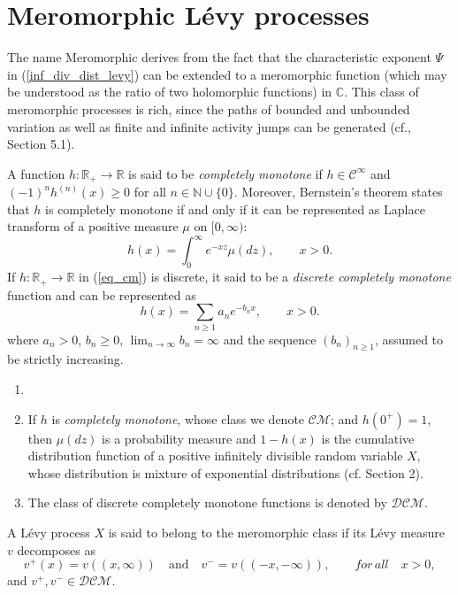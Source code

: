 \section{Meromorphic  L\'evy processes}\label{Sect_Merom}
The name Meromorphic derives from the fact that the characteristic exponent $\Psi$ in (\ref{inf_div_dist_levy}) can be extended to a meromorphic function (which may be understood as the ratio of two holomorphic functions) in $\mathbb{C}$. This class of meromorphic processes is rich, since the paths of bounded and unbounded variation as well as finite and infinite activity jumps can be generated (cf., Section 5.1).
\begin{definition}
A function $h:\mathbb{R}_+ \to \mathbb{R}$ is said to be \emph{completely monotone} if $h \in \mathcal{C}^\infty $ and $(-1)^n h^{(n)}(x) \geq 0$ for all $n \in \mathbb{N} \cup \{0\}$. Moreover, Bernstein's theorem states that $h$ is completely monotone if and only if it can be represented as Laplace transform of a positive measure $\mu$ on $[0, \infty)$:
\begin{equation}\label{eq_cm}
    h(x) = \int_0^\infty e^{-xz} \mu(dz),  \qquad x>0. 
\end{equation}
If $h:\mathbb{R}_+ \to \mathbb{R}$ in (\ref{eq_cm}) is discrete, it said to be a \emph{discrete completely monotone} function and can be represented as  
\begin{equation*}
    h(x) = \sum_{n \geq 1} a_n e^{-b_n x}, \qquad x>0.
\end{equation*}
where $a_n >0$, $b_n \geq 0$, $\lim_{n \to \infty} b_n = \infty$ and the sequence $(b_n)_{n \geq 1}$, assumed to be strictly increasing.
\end{definition}
\begin{remark}
\begin{enumerate}[label=(\roman*)]
    \item[]
    \item If $h$ is \emph{completely monotone}, whose class we denote $\mathcal{C} \mathcal{M}$; and   $h(0^+) = 1$, then $\mu(dz)$ is a probability measure and $1-h(x)$ is the cumulative distribution function of a positive infinitely divisible random variable $X$, whose distribution is mixture of exponential distributions (cf.  Section 2).
    \item The class of discrete completely monotone functions is denoted by $\mathcal{D}\mathcal{C} \mathcal{M}$.
\end{enumerate}

\end{remark}
\begin{definition}
A L\'evy process $X$ is said to belong to the meromorphic class if its L\'evy measure $v$ decomposes as 
\begin{equation*}
    v^+(x) = v((x, \infty)) \quad \text{and} \quad  v^- = v((-x, -\infty)), \qquad for \, all\quad x > 0,
\end{equation*}
and $v^+, v^- \in \mathcal{D}\mathcal{C} \mathcal{M}$.
\end{definition}
